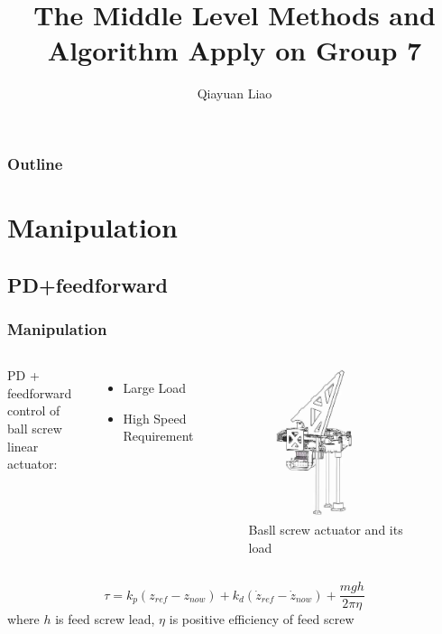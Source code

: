 \documentclass{beamer}
\title{The Middle Level Methods and Algorithm Apply on Group 7}
\author{Qiayuan Liao\inst{1}}
\institute[] %
{
  \inst{1}
  liaoqiayuan@gmail.com
}
\begin{document}
\begin{frame}
  \titlepage
\end{frame}

\begin{frame}
  \frametitle{Outline}
  \tableofcontents
\end{frame}

\section{Manipulation}

\subsection{PD+feedforward}
\begin{frame}
  \frametitle{Manipulation}
  \vspace{-2.0cm}
  \begin{columns}
    PD + feedforward control of ball screw linear actuator:
    \begin{itemize}
      \item Large Load
      \item High Speed Requirement
    \end{itemize}

    \begin{figure}
      \includegraphics[width = 0.8\textwidth]{fig/screw.jpg}
      \caption{Basll screw actuator and its load}
    \end{figure}
  \end{columns}
  \begin{equation}
    \tau = k_p(z_{ref}-z_{now})+k_d(\dot{z}_{ref}-\dot{z}_{now})+ \frac{mgh}{2\pi \eta}
  \end{equation}
  where $h$ is feed screw lead, $\eta$ is positive efficiency of feed screw
\end{frame}
\end{document}
